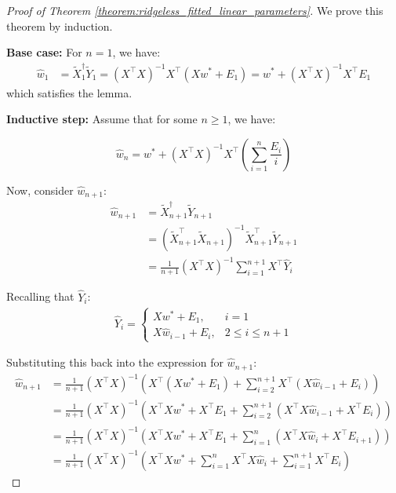 \begin{proof}[Proof of Theorem \ref{theorem:ridgeless_fitted_linear_parameters}]

We prove this theorem by induction.

\textbf{Base case:} For $n=1$, we have:
\begin{align*}
\hat{w}_1 &= \tilde{X}_1^{\dagger} \tilde{Y}_1 = (X^\top X)^{-1} X^\top (Xw^* + E_1) = w^* + (X^\top X)^{-1} X^\top E_1
\end{align*}
which satisfies the lemma.

\textbf{Inductive step:} Assume that for some $n \geq 1$, we have:

\begin{equation*}
\hat{w}_n = w^* + (X^\top X)^{-1} X^\top \left(\sum_{i=1}^n \frac{E_i}{i}\right)
\end{equation*}

Now, consider $\hat{w}_{n+1}$:
\begin{align*}
\hat{w}_{n+1} &= \tilde{X}_{n+1}^{\dagger} \tilde{Y}_{n+1} \\
&= (\tilde{X}_{n+1}^\top \tilde{X}_{n+1})^{-1} \tilde{X}_{n+1}^\top \tilde{Y}_{n+1} \\
&= \frac{1}{n+1}(X^\top X)^{-1} \sum_{i=1}^{n+1} X^\top \hat{Y}_i
\end{align*}

Recalling that $\hat{Y}_i$:
\begin{align*}
\hat{Y}_i = \begin{cases}
X w^* + E_1, & i = 1 \\
X \hat{w}_{i-1} + E_i, & 2 \leq i \leq n+1
\end{cases}
\end{align*}

Substituting this back into the expression for $\hat{w}_{n+1}$:
\begin{align*}
\hat{w}_{n+1} &= \frac{1}{n+1}(X^\top X)^{-1} \left(X^\top (X w^* + E_1) + \sum_{i=2}^{n+1} X^\top (X\hat{w}_{i-1} + E_i)\right) \\
&= \frac{1}{n+1}(X^\top X)^{-1} \left(X^\top Xw^* + X^\top E_1 + \sum_{i=2}^{n+1} (X^\top X\hat{w}_{i-1} + X^\top E_i)\right) \\
&= \frac{1}{n+1}(X^\top X)^{-1} \left(X^\top Xw^* + X^\top E_1 + \sum_{i=1}^{n} (X^\top X\hat{w}_i + X^\top E_{i+1})\right) \\
&= \frac{1}{n+1}(X^\top X)^{-1} \left(X^\top X w^* + \sum_{i=1}^{n} X^\top X\hat{w}_i + \sum_{i=1}^{n+1} X^\top E_i\right)
\end{align*}


\end{proof}
